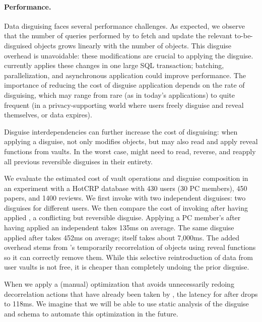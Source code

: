 \paragraph{Performance.}
\label{sec:perf}

Data disguising faces several performance challenges.
%
%
As expected, we observe that the number of queries performed by \sys to fetch and update
the relevant to-be-disguised objects grows linearly with the number of objects.
%
This disguise overhead is unavoidable: these modifications are crucial to applying the
disguise.
%
\sys currently applies these changes in one large SQL transaction; batching, parallelization,
and asynchronous application could improve performance.
%
The importance of reducing the cost of disguise application depends on the rate of
disguising, which may range from rare (as in today's applications) to quite frequent (in a
privacy-supporting world where users freely disguise and reveal themselves, or data expires).
%

%
Disguise interdependencies can further increase the cost of disguising: when applying a
disguise, \sys not only modifies objects, but may also read and apply reveal functions from
vaults.
%
In the worst case, \sys might need to read, reverse, and reapply all previous reversible
disguises in their entirety.
%

We evaluate the estimated cost of vault operations and disguise composition in an experiment
with a HotCRP database with 430 users (30 PC members), 450 papers, and 1400 reviews.
%
We first invoke \sys with two independent disguises: two \hrtbfplus disguises for different users.
%
We then compare the cost of invoking \hrtbfplus after having applied \hconfanon, a conflicting but reversible
disguise.
%
Applying a PC member's \hrtbfplus after having applied an independent \hrtbfplus takes 135ms on
average.
%
The same \hrtbfplus disguise applied after \hconfanon takes 452ms on average;
\hconfanon itself takes about 7,000ms.
%
The added overhead stems from \sys's temporarily recorrelation of objects
using reveal functions so it can correctly remove them.
%
While this selective reintroduction of data from user vaults is not free, it is cheaper than
completely undoing the prior \hconfanon disguise.
%

%
When we apply a (manual) optimization that avoids unnecessarily redoing decorrelation
actions that have already been taken by \hconfanon, the latency for \hrtbfplus after \hconfanon
drops to 118ms.
%
We imagine that we will be able to use static analysis of the disguise and schema to automate
this optimization in the future.
%
